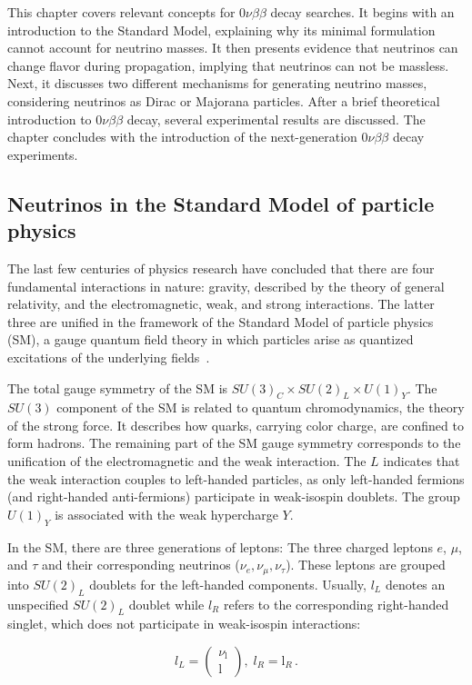 This chapter covers relevant concepts for $0 \nu \beta \beta$ decay searches. It begins with an introduction to the Standard Model, explaining why its minimal formulation cannot account for neutrino masses. It then presents evidence that neutrinos can change flavor during propagation, implying that neutrinos can not be massless. 
Next, it discusses two different mechanisms for generating neutrino masses, considering neutrinos as Dirac or Majorana particles. After a brief theoretical introduction to $0 \nu \beta \beta$ decay, several experimental results are discussed. 
The chapter concludes with the introduction of the next-generation $0 \nu \beta \beta$ decay experiments.

\subsection{Neutrinos in the Standard Model of particle physics}
The last few centuries of physics research have concluded that there are four fundamental interactions in nature: gravity, described by the theory of general relativity, and the electromagnetic, weak, and strong interactions. The latter three are unified in the framework of the Standard Model of particle physics (SM), a gauge quantum field theory in which particles arise as quantized excitations of the underlying fields~\cite{peskin_introduction_2019}. 

The total gauge symmetry of the SM is $SU(3)_C \times SU(2)_L \times U(1)_Y$. The $SU(3)$ component of the SM is related to quantum chromodynamics, the theory of the strong force. 
It describes how quarks, carrying color charge, are confined to form hadrons. The remaining part of the SM gauge symmetry corresponds to the unification of the electromagnetic and the weak interaction. The $L$ indicates that the weak interaction couples to left-handed particles, as only left-handed fermions (and right-handed anti-fermions) participate in weak-isospin doublets. The group $U(1)_Y$ is associated with the weak hypercharge $Y$. 

In the SM, there are three generations of leptons: The three charged leptons $e$, $\mu$, and $\tau$ and their corresponding neutrinos ($\nu_e, \nu_\mu, \nu_\tau$). These leptons are grouped into $SU(2)_L$ doublets for the left-handed components. Usually, $l_L$ denotes an unspecified $SU(2)_L$ doublet while $l_R$ refers to the corresponding right-handed singlet, which does not participate in weak-isospin interactions:

\begin{equation} 
\label{eq:su2_leptonic_doublets}
l_L = 
	\begin{pmatrix} \nu_{\text{l}} \\ \text{l} \end{pmatrix}, \; 
    l_R = \text{l}_R \,.
\end{equation}

